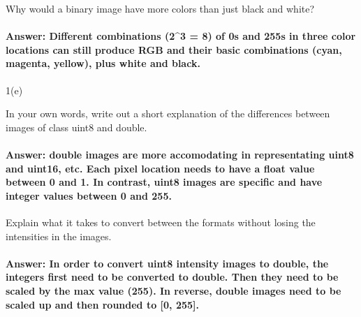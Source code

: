 \documentclass[11pt]{article}
\begin{document}
Why would a binary image have more colors than just black and white?

\hypertarget{answer-different-combinations-23-8-of-0s-and-255s-in-three-color-locations-can-still-produce-rgb-and-their-basic-combinations-cyan-magenta-yellow-plus-white-and-black.}{%
\paragraph{Answer: Different combinations (2\^{}3 = 8) of 0s and 255s in
three color locations can still produce RGB and their basic combinations
(cyan, magenta, yellow), plus white and
black.}\label{answer-different-combinations-23-8-of-0s-and-255s-in-three-color-locations-can-still-produce-rgb-and-their-basic-combinations-cyan-magenta-yellow-plus-white-and-black.}}

    1(e)

In your own words, write out a short explanation of the differences
between images of class uint8 and double.

\hypertarget{answer-double-images-are-more-accomodating-in-representating-uint8-and-uint16-etc.-each-pixel-location-needs-to-have-a-float-value-between-0-and-1.-in-contrast-uint8-images-are-specific-and-have-integer-values-between-0-and-255.}{%
\paragraph{Answer: double images are more accomodating in representating
uint8 and uint16, etc. Each pixel location needs to have a float value
between 0 and 1. In contrast, uint8 images are specific and have integer
values between 0 and
255.}\label{answer-double-images-are-more-accomodating-in-representating-uint8-and-uint16-etc.-each-pixel-location-needs-to-have-a-float-value-between-0-and-1.-in-contrast-uint8-images-are-specific-and-have-integer-values-between-0-and-255.}}

Explain what it takes to convert between the formats without losing the
intensities in the images.

\hypertarget{answer-in-order-to-convert-uint8-intensity-images-to-double-the-integers-first-need-to-be-converted-to-double.-then-they-need-to-be-scaled-by-the-max-value-255.-in-reverse-double-images-need-to-be-scaled-up-and-then-rounded-to-0-255.}{%
\paragraph{Answer: In order to convert uint8 intensity images to double,
the integers first need to be converted to double. Then they need to be
scaled by the max value (255). In reverse, double images need to be
scaled up and then rounded to {[}0,
255{]}.}\label{answer-in-order-to-convert-uint8-intensity-images-to-double-the-integers-first-need-to-be-converted-to-double.-then-they-need-to-be-scaled-by-the-max-value-255.-in-reverse-double-images-need-to-be-scaled-up-and-then-rounded-to-0-255.}}
\end{document}
